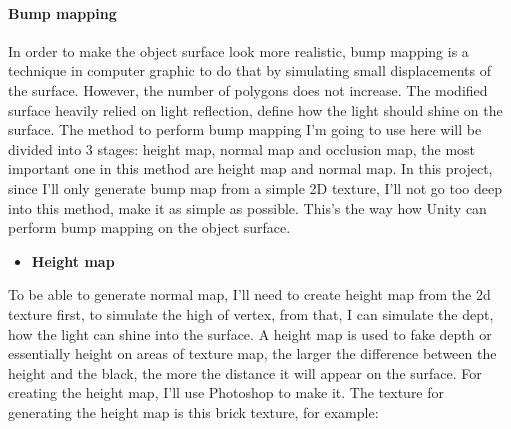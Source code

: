 \documentclass[a4paper, 13pt]{extarticle}
\begin{document}
	\paragraph{Bump mapping}
	In order to make the object surface look more realistic, bump mapping is a technique in computer graphic to do that by simulating small displacements of the surface. However, the number of polygons does not increase. The modified surface heavily relied on light reflection, define how the light should shine on the surface.
	The method to perform bump mapping I'm going to use here will be divided into 3 stages: height map, normal map and occlusion map, the most important one in this method are height map and normal map. In this project, since I'll only generate bump map from a simple 2D texture, I'll not go too deep into this method, make it as simple as possible. This's the way how Unity can perform bump mapping on the object surface.
	\begin{itemize}
		\item \bfseries Height map	 	
	\end{itemize}
		To be able to generate normal map, I'll need to create height map from the 2d texture first, to simulate the high of vertex, from that, I can simulate the dept, how the light can shine into the surface. A height map is used to fake depth or essentially height on areas of texture map, the larger the difference between the height and the black, the more the distance it will appear on the surface. For creating the height map, I'll use Photoshop to make it. The texture for generating  the height map is this brick texture, for example: 
\end{document}
